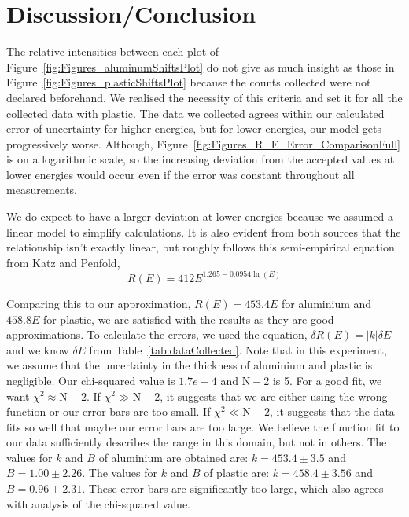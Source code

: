 
\section{Discussion/Conclusion}

\label{sec:discussion_conclusion} The relative intensities between each plot of Figure~\ref{fig:Figures_aluminumShiftsPlot} do not give as much insight as those in Figure~\ref{fig:Figures_plasticShiftsPlot} because the counts collected were not declared beforehand. We realised the necessity of this criteria and set it for all the collected data with plastic. The data we collected agrees within our calculated error of uncertainty for higher energies, but for lower energies, our model gets progressively worse. Although, Figure~\ref{fig:Figures_R_E_Error_ComparisonFull} is on a logarithmic scale, so the increasing deviation from the accepted values at lower energies would occur even if the error was constant throughout all measurements. 

We do expect to have a larger deviation at lower energies because we assumed a linear model to simplify calculations. It is also evident from both sources that the relationship isn't exactly linear, but roughly follows this semi-empirical equation from Katz and Penfold,\cite{RevModPhys.24.28} 
\begin{equation}
	R(E) = 412 E^{1.265 - 0.0954 \ln(E)} \label{eq:acceptedEq} 
\end{equation}

Comparing this to our approximation, $R(E) = 453.4 E$ for aluminium and $458.8 E$ for plastic, we are satisfied with the results as they are good approximations.   To calculate the errors, we used the equation,\cite{093570275X} $\delta R(E) = |k| \delta E$ and we know $\delta E$ from Table~\ref{tab:dataCollected}. Note that in this experiment, we assume that the uncertainty in the thickness of aluminium and plastic is negligible.  Our chi-squared value is $1.7e-4$ and $\text{N}-2$ is 5.  For a good fit, we want $\chi^2\approx \text{N}-2$.  If $\chi^2 \gg \text{N}-2$, it suggests that we are either using the wrong function or our error bars are too small.  If $\chi^2 \ll \text{N}-2$, it suggests that the data fits so well that maybe our error bars are too large.\cite{garcia2000numerical}  We believe the function fit to our data sufficiently describes the range in this domain, but not in others.  The values for $k$ and $B$ of aluminium are obtained are: $k = 453.4 \pm 3.5$ and $B = 1.00 \pm 2.26$.  The values for $k$ and $B$ of plastic are: $k = 458.4 \pm 3.56$ and $B = 0.96 \pm 2.31$.  These error bars are significantly too large, which also agrees with analysis of the chi-squared value.

